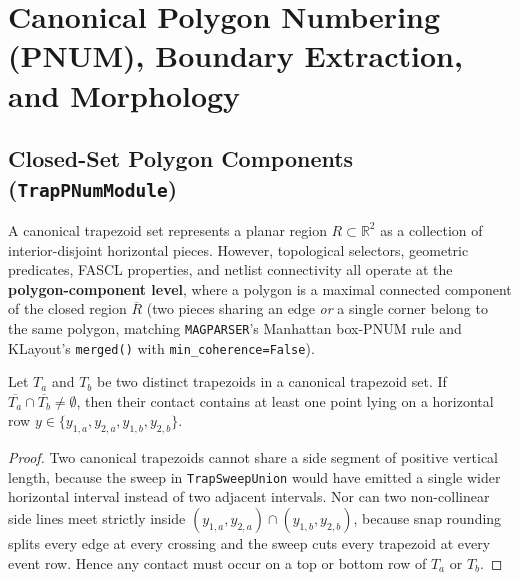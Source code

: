 \chapter{Canonical Polygon Numbering (PNUM), Boundary Extraction, and Morphology}
\label{ch:pnum_morph}

\section{Closed-Set Polygon Components (\texttt{TrapPNumModule})}

A canonical trapezoid set represents a planar region $R \subset \mathbb{R}^2$ as a collection of interior-disjoint horizontal pieces. However, topological selectors, geometric predicates, FASCL properties, and netlist connectivity all operate at the \textbf{polygon-component level}, where a polygon is a maximal connected component of the closed region $\overline{R}$ (two pieces sharing an edge \emph{or} a single corner belong to the same polygon, matching \texttt{MAGPARSER}'s Manhattan box-PNUM rule and KLayout's \texttt{merged()} with \texttt{min\_coherence=False}).

\begin{theorem}
Let $T_a$ and $T_b$ be two distinct trapezoids in a canonical trapezoid set. If $\overline{T_a} \cap \overline{T_b} \ne \emptyset$, then their contact contains at least one point lying on a horizontal row $y \in \{y_{1,a}, y_{2,a}, y_{1,b}, y_{2,b}\}$.
\end{theorem}
\begin{proof}
Two canonical trapezoids cannot share a side segment of positive vertical length, because the sweep in \texttt{TrapSweepUnion} would have emitted a single wider horizontal interval instead of two adjacent intervals. Nor can two non-collinear side lines meet strictly inside $(y_{1,a}, y_{2,a}) \cap (y_{1,b}, y_{2,b})$, because snap rounding splits every edge at every crossing and the sweep cuts every trapezoid at every event row. Hence any contact must occur on a top or bottom row of $T_a$ or $T_b$.
\end{proof}

